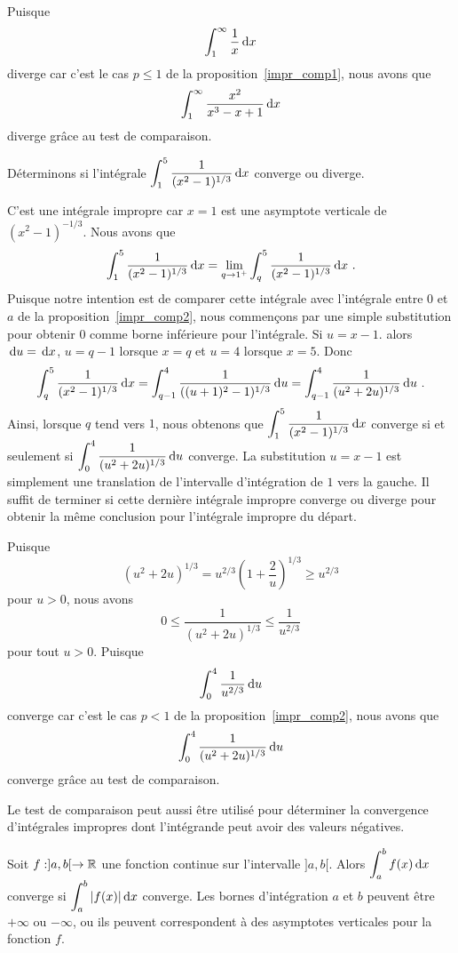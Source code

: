 {\begin{egg}
Puisque
\[
\int_1^\infty \frac{1}{x} \,\mathrm{d}x
\]
diverge car c'est le cas $p \leq 1$ de la proposition~\ref{impr_comp1},
nous avons que
\[
\displaystyle \int_1^\infty \frac{x^2}{x^3-x+1}\,\mathrm{d}x
\]
diverge grâce au test de comparaison.
\label{testCompSin}
\end{egg}

\begin{egg}
Déterminons si l'intégrale
$\displaystyle \int_1^5 \frac{1}{(x^2-1)^{1/3}} \,\mathrm{d}x$
converge ou diverge.

C'est une intégrale impropre car $x=1$ est une asymptote verticale de
$(x^2-1)^{-1/3}$.  Nous avons que
\[
\int_1^5 \frac{1}{(x^2-1)^{1/3}} \,\mathrm{d}x = \lim_{q\to 1^+}
\int_q^5 \frac{1}{(x^2-1)^{1/3}} \,\mathrm{d}x \ .
\]
Puisque notre intention est de comparer cette intégrale avec
l'intégrale entre $0$ et $a$ de la proposition~\ref{impr_comp2}, nous
commençons par une simple substitution pour obtenir $0$ comme borne
inférieure pour l'intégrale.  Si $u=x-1$. alors $\,\mathrm{d}u = \,\mathrm{d}x$,
$u=q-1$ lorsque $x=q$ et $u=4$ lorsque $x=5$.  Donc
\[
\int_q^5 \frac{1}{(x^2-1)^{1/3}} \,\mathrm{d}x
= \int_{q-1}^4 \frac{1}{((u+1)^2-1)^{1/3}} \,\mathrm{d}u
= \int_{q-1}^{4} \frac{1}{(u^2+2u)^{1/3}} \,\mathrm{d}u \ .
\]
Ainsi, lorsque $q$ tend vers $1$, nous obtenons que
$\displaystyle \int_1^5 \frac{1}{(x^2-1)^{1/3}} \,\mathrm{d}x$ converge si et
seulement si $\displaystyle \int_0^{4} \frac{1}{(u^2+2u)^{1/3}} \,\mathrm{d}u$
converge.  La substitution $u=x-1$ est simplement une translation de
l'intervalle d'intégration de $1$ vers la gauche.  Il suffit de
terminer si cette dernière intégrale impropre converge ou diverge pour
obtenir la même conclusion pour l'intégrale impropre du départ.

Puisque
\[
(u^2+2u)^{1/3} = u^{2/3} \left(1+\frac{2}{u}\right)^{1/3} \geq u^{2/3}
\]
pour $u>0$, nous avons
\[
0 \leq \frac{1}{(u^2+2u)^{1/3}} \leq \frac{1}{u^{2/3}}
\]
pour tout $u>0$.  Puisque
\[
\int_0^{4} \frac{1}{u^{2/3}} \,\mathrm{d}u
\]
converge car c'est le cas $p<1$ de la proposition~\ref{impr_comp2}, nous avons
que
\[
\int_0^{4} \frac{1}{(u^2+2u)^{1/3}} \,\mathrm{d}u
\]
converge grâce au test de comparaison.
\end{egg}

Le test de comparaison peut aussi être utilisé pour déterminer la
convergence d'intégrales impropres dont l'intégrande peut avoir des
valeurs négatives.

\begin{focus}{\thm} \label{compabsolu}
Soit $f:]a,b[\rightarrow \mathbb{R}$ une fonction continue sur l'intervalle
$]a,b[$.   Alors $\displaystyle \int_a^b f(x) \,\mathrm{d}x$
converge si $\displaystyle \int_a^b |f(x)| \,\mathrm{d}x$ converge.
Les bornes d'intégration $a$ et $b$ peuvent être $+\infty$
ou $-\infty$, ou ils peuvent correspondent à des asymptotes verticales
pour la fonction $f$. 
\end{focus}

}
